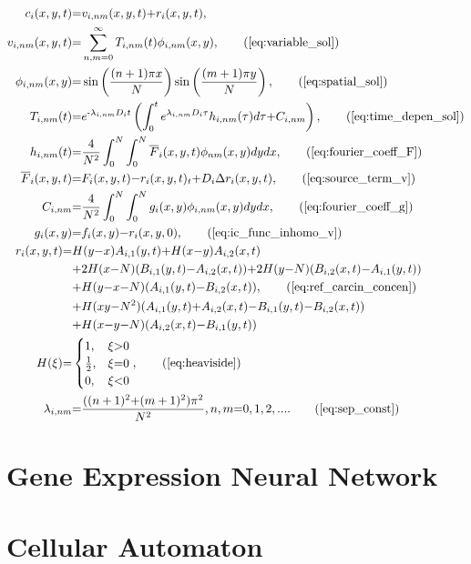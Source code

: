 \documentclass[\main/thesis.tex]{subfiles}
\begin{document}
\begin{align}
c_i(x, y, t) &{=} v_{i,nm}(x, y, t) {+} r_i(x, y, t),
\label{eq:carcin_sol}\\
v_{i,nm}(x, y, t) &{=} \sum_{n,m{=}0}^{\infty} T_{i,nm}(t) \phi_{i,nm}(x, y), \tag{\ref{eq:variable_sol}}\\
\phi_{i,nm}(x, y) &{=} \sin\left( \frac{(n+1)\pi x}{N} \right) \sin\left( \frac{(m+1)\pi y}{N} \right), \tag{\ref{eq:spatial_sol}}\\
T_{i,nm}(t) &{=} e^{\minus\lambda_{i,nm} D_i t} \left( \int_{0}^{t} e^{\lambda_{i,nm} D_i \tau} h_{i,nm}(\tau) d\tau {+} C_{i,nm} \right), \tag{\ref{eq:time_depen_sol}}\\
h_{i,nm}(t) &{=} \frac{4}{N^2} \int_{0}^{N} \int_{0}^{N} \overline{F}_i(x, y, t) \phi_{nm}(x, y) dy dx, \tag{\ref{eq:fourier_coeff_F}}\\
\overline{F}_i(x, y, t) &{=} F_i(x, y, t) {-} r_i(x, y, t)_t {+} D_i\Delta r_i(x, y, t), \tag{\ref{eq:source_term_v}} \\
C_{i,nm} &{=} \frac{4}{N^2} \int_{0}^{N} \int_{0}^{N} g_i(x, y) \phi_{i,nm}(x, y) dy dx, \tag{\ref{eq:fourier_coeff_g}}\\
g_i(x, y) &{=} f_i(x, y) {-} r_i(x, y, 0), \tag{\ref{eq:ic_func_inhomo_v}}\\
r_i(x, y, t) {=} &H(y{-}x)A_{i, 1}(y, t) {+} H(x{-}y)A_{i, 2}(x, t) \nonumber\\
&{+} 2H(x{-}N)(B_{i, 1}(y, t) {-} A_{i, 2}(x, t)) {+} 2H(y{-}N)(B_{i, 2}(x, t) {-} A_{i, 1}(y, t)) \nonumber\\
&{+} H(y{-}x{-}N)(A_{i, 1}(y, t) {-} B_{i, 2}(x, t)), \tag{\ref{eq:ref_carcin_concen}}\\
&{+} H(xy{-}N^2)(A_{i, 1}(y, t) {+} A_{i, 2}(x, t) {-} B_{i, 1}(y, t) {-} B_{i, 2}(x, t)) \nonumber\\
&{+} H(x{-}y{-}N)(A_{i, 2}(x, t) {-} B_{i, 1}(y, t)) \nonumber\\
H(\xi) {=} &\begin{cases}
1, &\xi {>} 0 \\
\frac{1}{2}, &\xi {=} 0 \\
0, &\xi {<} 0
\end{cases}, \tag{\ref{eq:heaviside}}\\
\lambda_{i, nm} &{=} \frac{((n+1)^2 {+} (m+1)^2)\pi^2}{N^2}, n,m {=} 0, 1, 2, .... \tag{\ref{eq:sep_const}}
\end{align}

\section{Gene Expression Neural Network}

\section{Cellular Automaton}
\end{document}
